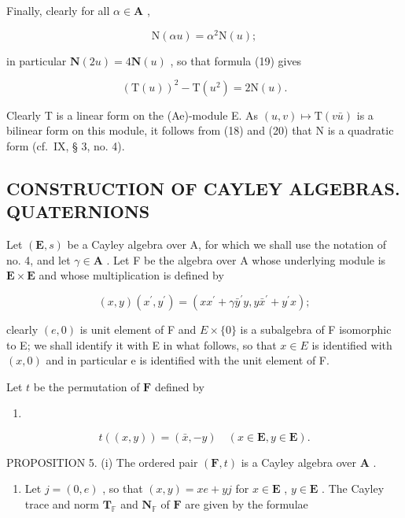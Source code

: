 Finally, clearly for all \(\alpha \in \mathbf{A}\) ,

\[
\mathrm{N} (\alpha u) = \alpha^ {2} \mathrm{N} (u);\tag{20}
\]

in particular \(\mathbf{N}(2u) = 4\mathbf{N}(u)\) , so that formula (19) gives

\[
(\mathrm{T} (u)) ^ {2} - \mathrm{T} (u ^ {2}) = 2 \mathrm{N} (u).\tag{21}
\]

Clearly T is a linear form on the (Ae)-module E. As \((u, v) \mapsto \mathrm{T}(v\bar{u})\) is a bilinear form on this module, it follows from (18) and (20) that N is a quadratic form (cf.~IX, § 3, no. 4).

\subsection{CONSTRUCTION OF CAYLEY ALGEBRAS. QUATERNIONS}

Let \((\mathbf{E}, s)\) be a Cayley algebra over A, for which we shall use the notation of no. 4, and let \(\gamma \in \mathbf{A}\) . Let F be the algebra over A whose underlying module is \(\mathbf{E} \times \mathbf{E}\) and whose multiplication is defined by

\[
(x, y) (x ^ {\prime}, y ^ {\prime}) = (x x ^ {\prime} + \gamma \bar {y} ^ {\prime} y, y \bar {x} ^ {\prime} + y ^ {\prime} x);\tag{22}
\]

clearly \((e,0)\) is unit element of F and \(E \times \{0\}\) is a subalgebra of F isomorphic to E; we shall identify it with E in what follows, so that \(x \in E\) is identified with \((x,0)\) and in particular e is identified with the unit element of F.

Let \(t\) be the permutation of \(\mathbf{F}\) defined by

\begin{enumerate}
\def\labelenumi{(\arabic{enumi})}
\setcounter{enumi}{22}
\tightlist
\item
\end{enumerate}

\[
t ((x, y)) = (\bar {x}, - y) \quad (x \in \mathbf {E}, y \in \mathbf {E}).
\]

PROPOSITION 5. (i) The ordered pair \((\mathbf{F}, t)\) is a Cayley algebra over \(\mathbf{A}\) .

\begin{enumerate}
\def\labelenumi{(\roman{enumi})}
\setcounter{enumi}{1}
\tightlist
\item
  Let \(j = (0, e)\) , so that \((x, y) = xe + yj\) for \(x \in \mathbf{E}\) , \(y \in \mathbf{E}\) . The Cayley trace and norm \(\mathbf{T}_{\mathbb{F}}\) and \(\mathbf{N}_{\mathbb{F}}\) of \(\mathbf{F}\) are given by the formulae
\end{enumerate}

